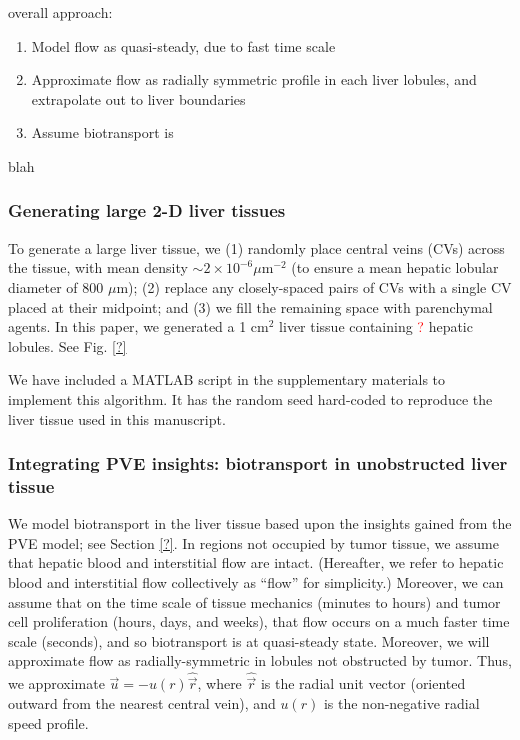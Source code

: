 \documentclass[smallextended,natbib]{svjour3}
\newcommand{\micron}{\mu\textrm{m}}
\newcommand{\red}[1]{\textcolor{red}{#1}}
\newcommand{\hatvec}[1]{\hat{\vec{#1}}}
\begin{document}
overall approach:
\begin{enumerate}
\item  
Model flow as quasi-steady, due to fast time scale 
\item 
Approximate flow as radially symmetric profile in each liver lobules, and extrapolate out to liver boundaries
\item 
Assume biotransport is 
\end{enumerate}

blah 

\subsubsection{Generating large 2-D liver tissues}
\label{sec:generate_liver}
To generate a large liver tissue, we (1) 
randomly place central veins (CVs) across the tissue, with  
mean density $\sim 2 \times 10^{-6} \micron^{-2}$ 
(to ensure a mean hepatic lobular diameter 
of 800 $\micron$); (2) replace any closely-spaced pairs of CVs with a 
single CV placed at their midpoint; and (3) we fill the remaining space 
with parenchymal agents. In this paper, we generated a 1 cm$^2$ liver 
tissue containing \red{?} hepatic lobules. See Fig. \ref{?} 

We have included a MATLAB script in the supplementary materials 
to implement this algorithm. It has the random seed hard-coded 
to reproduce the liver tissue used in this manuscript. 

\subsubsection{Integrating PVE insights: biotransport in unobstructed liver tissue}
We model biotransport in the liver tissue based upon the 
insights gained from the PVE model; see Section \ref{?}. In 
regions not occupied by tumor tissue, we assume that hepatic blood 
and interstitial flow are intact. (Hereafter, we 
refer to hepatic blood and interstitial flow collectively 
as ``flow'' for simplicity.) Moreover, we can assume that 
on the time scale of tissue mechanics (minutes to hours) and 
tumor cell proliferation (hours, days, and weeks), that flow occurs 
on a much faster time scale (seconds), and so biotransport is at quasi-steady 
state. Moreover, we will approximate flow as radially-symmetric in lobules not 
obstructed by tumor. Thus, we approximate $\vec{u} = - u(r) \hatvec{r}$, 
where $\hatvec{r}$ is the radial unit vector (oriented outward from the nearest
central vein), and $u(r)$ is the non-negative radial speed profile. 
\end{document}
